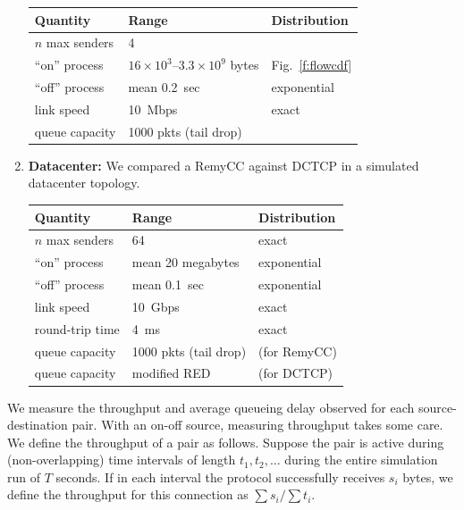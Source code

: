 \begin{enumerate}
\begin{tabular}{lll}
\bf Quantity & \bf Range & \bf Distribution \\
\hline $n$ max senders & 4 \\
``on'' process & $16 \times 10^3$--$3.3 \times 10^9$ bytes & Fig.~\ref{f:flowcdf}\\
``off'' process & mean 0.2~sec & exponential \\
link speed & 10~Mbps & exact \\
queue capacity & 1000 pkts (tail drop) \\
\end{tabular}

\item {\bf Datacenter:} We compared a RemyCC against
  DCTCP in a simulated datacenter topology.

\begin{tabular}{lll}
\bf Quantity & \bf Range & \bf Distribution \\
\hline $n$ max senders & 64 & exact \\
``on'' process & mean 20 megabytes & exponential \\
``off'' process & mean 0.1~sec & exponential \\
link speed & 10~Gbps & exact \\
round-trip time & 4~ms & exact \\
queue capacity & 1000 pkts (tail drop) & (for RemyCC) \\
queue capacity & modified RED & (for DCTCP) \\
\end{tabular}

\end{enumerate}



\medskip
{}  We measure the throughput and average
queueing delay observed for each source-destination pair. With an
on-off source, measuring throughput takes some care.  We define the
throughput of a pair as follows. Suppose the pair is active during
(non-overlapping) time intervals of length $t_1, t_2, \ldots$ during
the entire simulation run of $T$ seconds. If in each interval the
protocol successfully receives $s_i$ bytes, we define the throughput
for this connection as $\sum s_i / \sum t_i$.%


